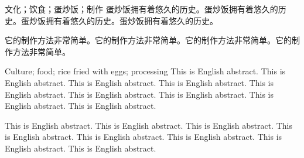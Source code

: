 \begin{cnabstract}{文化；饮食；蛋炒饭；制作}
蛋炒饭拥有着悠久的历史。蛋炒饭拥有着悠久的历史。蛋炒饭拥有着悠久的历史。蛋炒饭拥有着悠久的历史。

它的制作方法非常简单。它的制作方法非常简单。它的制作方法非常简单。它的制作方法非常简单。
\end{cnabstract}


\begin{engabstract}{Culture; food; rice fried with eggs; processing}
\noindent This is English abstract. This is English abstract. This is English abstract. This is English abstract. This is English abstract. This is English abstract. This is English abstract. This is English abstract. This is English abstract. 

This is English abstract. This is English abstract. This is English abstract. This is English abstract. This is English abstract. This is English abstract. This is English abstract. This is English abstract. 
\end{engabstract}